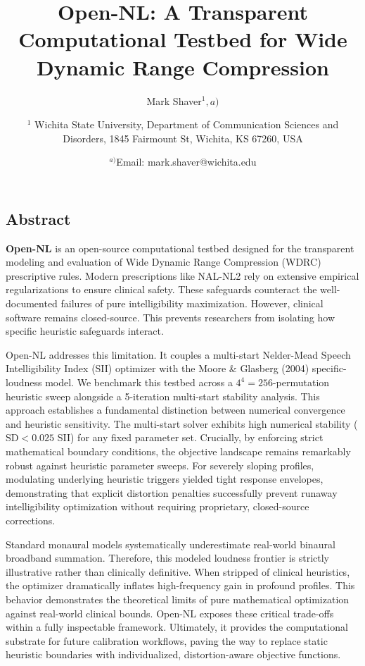 \documentclass[
  12pt,
]{article}
\title{Open-NL: A Transparent Computational Testbed for Wide Dynamic
Range Compression}
\author{Mark
Shaver\(^1,a)\) \and \parbox{\textwidth}{\centering $^1$ Wichita State University, Department of Communication Sciences and Disorders, 1845 Fairmount St, Wichita, KS 67260, USA} \and \(^{a)}\)Email:
mark.shaver@wichita.edu}
\date{}
\begin{document}
\maketitle

\linenumbers

\subsection{Abstract}\label{abstract}

\textbf{Open-NL} is an open-source computational testbed designed for
the transparent modeling and evaluation of Wide Dynamic Range
Compression (WDRC) prescriptive rules. Modern prescriptions like NAL-NL2
rely on extensive empirical regularizations to ensure clinical safety.
These safeguards counteract the well-documented failures of pure
intelligibility maximization. However, clinical software remains
closed-source. This prevents researchers from isolating how specific
heuristic safeguards interact.

Open-NL addresses this limitation. It couples a multi-start Nelder-Mead
Speech Intelligibility Index (SII) optimizer with the Moore \& Glasberg
(2004) specific-loudness model. We benchmark this testbed across a
\(4^4 = 256\)-permutation heuristic sweep alongside a 5-iteration
multi-start stability analysis. This approach establishes a fundamental
distinction between numerical convergence and heuristic sensitivity. The
multi-start solver exhibits high numerical stability
(\(\text{SD} < 0.025\) SII) for any fixed parameter set. Crucially, by
enforcing strict mathematical boundary conditions, the objective
landscape remains remarkably robust against heuristic parameter sweeps.
For severely sloping profiles, modulating underlying heuristic triggers
yielded tight response envelopes, demonstrating that explicit distortion
penalties successfully prevent runaway intelligibility optimization
without requiring proprietary, closed-source corrections.

Standard monaural models systematically underestimate real-world
binaural broadband summation. Therefore, this modeled loudness frontier
is strictly illustrative rather than clinically definitive. When
stripped of clinical heuristics, the optimizer dramatically inflates
high-frequency gain in profound profiles. This behavior demonstrates the
theoretical limits of pure mathematical optimization against real-world
clinical bounds. Open-NL exposes these critical trade-offs within a
fully inspectable framework. Ultimately, it provides the computational
substrate for future calibration workflows, paving the way to replace
static heuristic boundaries with individualized, distortion-aware
objective functions.
\end{document}

